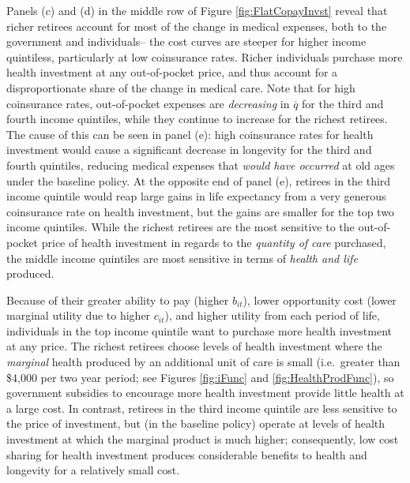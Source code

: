 \documentclass[12pt,pdftex,letterpaper]{article}
\newcommand{\Con}{c}
\newcommand{\Bank}{b}
\newcommand{\Copay}{q}
\begin{document}
Panels (c) and (d) in the middle row of Figure \ref{fig:FlatCopayInvst} reveal that richer retirees account for most of the change in medical expenses, both to the government and individuals-- the cost curves are steeper for higher income quintiless, particularly at low coinsurance rates.  Richer individuals purchase more health investment at any out-of-pocket price, and thus account for a disproportionate share of the change in medical care.  Note that for high coinsurance rates, out-of-pocket expenses are \textit{decreasing} in $\overline{\Copay}$ for the third and fourth income quintiles, while they continue to increase for the richest retirees.  The cause of this can be seen in panel (e): high coinsurance rates for health investment would cause a significant decrease in longevity for the third and fourth quintiles, reducing medical expenses that \textit{would have occurred} at old ages under the baseline policy.  At the opposite end of panel (e), retirees in the third income quintile would reap large gains in life expectancy from a very generous coinsurance rate on health investment, but the gains are smaller for the top two income quintiles. While the richest retirees are the most sensitive to the out-of-pocket price of health investment in regards to the \textit{quantity of care} purchased, the middle income quintiles are most sensitive in terms of \textit{health and life} produced.

Because of their greater ability to pay (higher $\Bank_{it}$), lower opportunity cost (lower marginal utility due to higher $\Con_{it}$), and higher utility from each period of life, individuals in the top income quintile want to purchase more health investment at any price.  The richest retirees choose levels of health investment where the \textit{marginal} health produced by an additional unit of care is small (i.e.\ greater than \$4,000 per two year period; see Figures \ref{fig:iFunc} and \ref{fig:HealthProdFunc}), so government subsidies to encourage more health investment provide little health at a large cost.  In contrast, retirees in the third income quintile are less sensitive to the price of investment, but (in the baseline policy) operate at levels of health investment at which the marginal product is much higher; consequently, low cost sharing for health investment produces considerable benefits to health and longevity for a relatively small cost.
\end{document}
